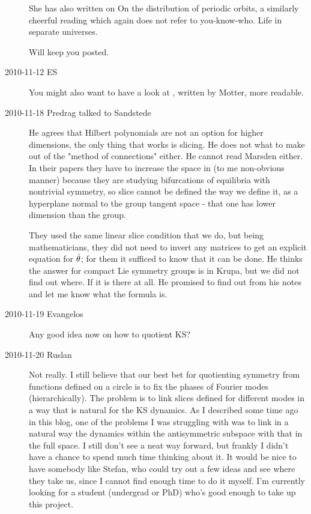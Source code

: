 \begin{description}
She has also written on
{On the distribution of periodic orbits}, a similarly cheerful reading
which again does not refer to you-know-who. Life in separate universes.

Will keep you posted.

\item[2010-11-12 ES] You might also want to have a look at \cite{motter09},
written by Motter, more readable.

\item[2010-11-18 Predrag talked to Sandstede]
He agrees that Hilbert polynomials are not an option for higher dimensions,
the only thing that works is slicing. He does not what to make out
of the "method of connections" either. He cannot read Marsden either.
In their papers they have to increase the
space in (to me non-obvious manner) because they are studying
bifurcations of equilibria with nontrivial symmetry, so slice cannot be
defined the way we define it, as a hyperplane normal to the group tangent
space - that one has lower dimension than the group.

They used the same linear slice condition that we do, but being mathematicians,
they did not need to invert any matrices to get an explicit equation for
$\dot{\theta}$; for them it sufficed to know that it can be done.
He thinks the answer for compact Lie symmetry groups is in Krupa, but
we did not find out where. If it is there at all. He promised to find out
from his notes and let me know what the formula is.

\item[2010-11-19 Evangelos]
Any good idea now on how to quotient KS?

\item[2010-11-20 Ruslan]
Not really.  I still believe that our best bet for quotienting 
symmetry from functions defined on a circle is to fix the phases of
Fourier modes (hierarchically).  The problem is to link slices defined
for different modes in a way that is natural for the KS dynamics.  As I
described some time ago in this blog, one of the problems I was struggling
with was to link in a natural way the dynamics within the antisymmetric
subspace with that in the full space.  I still don't see a neat way
forward, but frankly I didn't have a chance to spend much time thinking
about it.  It would be nice to have somebody like Stefan, who could try
out a few ideas and see where they take us, since I cannot find enough
time to do it myself.  I'm currently looking for a student (undergrad or
PhD) who's good enough to take up this project.



\end{description}
